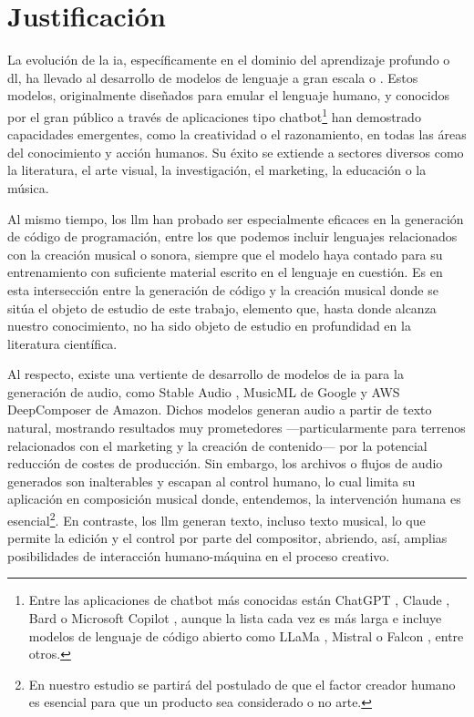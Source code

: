 \section{Justificación}



La evolución de la \gls{ia}, específicamente en el dominio del aprendizaje profundo o \gls{dl}, ha llevado al desarrollo de {modelos de lenguaje a gran escala} o . Estos modelos, originalmente diseñados para emular el lenguaje humano, y conocidos por el gran público a través de aplicaciones tipo {chatbot}\footnote{Entre las aplicaciones de {chatbot} más conocidas están {ChatGPT} \citep{IntroducingChatGPT}, {Claude} \citep{IntroducingClaude}, {Bard} \citep{BardChatbot2024} o {Microsoft Copilot} \citep{mehdiAnnouncingMicrosoftCopilot2023}, aunque la lista cada vez es más larga e incluye modelos de lenguaje de código abierto como {LLaMa} \citep{touvronLLaMAOpenEfficient2023}, {Mistral} \citep{jiangMistral7B2023} o {Falcon} \citep{almazroueiFalconSeriesOpen2023}, entre otros.} han demostrado capacidades emergentes, como la creatividad o el razonamiento, en todas las áreas del conocimiento y acción humanos. Su éxito se extiende a sectores diversos como la literatura, el arte visual, la investigación, el marketing, la educación o la música. 

Al mismo tiempo, los \gls{llm} han probado ser especialmente eficaces en la generación de código de programación, entre los que podemos incluir lenguajes relacionados con la creación musical o sonora, siempre que el modelo haya contado para su entrenamiento con suficiente material escrito en el lenguaje en cuestión. Es en esta intersección entre la generación de código y la creación musical donde se sitúa el objeto de estudio de este trabajo, elemento que, hasta donde alcanza nuestro conocimiento, no ha sido objeto de estudio en profundidad en la literatura científica.

Al respecto, existe una vertiente de desarrollo de modelos de \gls{ia} para la generación de audio, como {Stable Audio} \citep{Audio}, {MusicML} \citep{MusicLM} de Google y {AWS DeepComposer} \citep{AWSDeepComposer} de Amazon. Dichos modelos generan audio a partir de texto natural, mostrando resultados muy prometedores ---particularmente para terrenos relacionados con el marketing y la creación de contenido--- por la potencial reducción de costes de producción. Sin embargo, los archivos o flujos de audio generados son inalterables y escapan al control humano, lo cual limita su aplicación en composición musical donde, entendemos, la intervención humana es esencial\footnote{En nuestro estudio se partirá del postulado de que el factor creador humano es esencial para que un producto sea considerado o no arte.}. En contraste, los \gls{llm} generan texto, incluso texto musical, lo que permite la edición y el control por parte del compositor, abriendo, así, amplias posibilidades de interacción humano-máquina en el proceso creativo.

